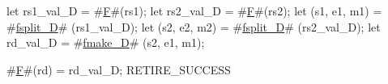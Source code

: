 let rs1_val_D    = #\hyperref[sailRISCVzF]{F}#(rs1);
let rs2_val_D    = #\hyperref[sailRISCVzF]{F}#(rs2);
let (s1, e1, m1) = #\hyperref[sailRISCVzfsplitzyD]{fsplit\_D}# (rs1_val_D);
let (s2, e2, m2) = #\hyperref[sailRISCVzfsplitzyD]{fsplit\_D}# (rs2_val_D);
let rd_val_D     = #\hyperref[sailRISCVzfmakezyD]{fmake\_D}# (s2, e1, m1);

#\hyperref[sailRISCVzF]{F}#(rd) = rd_val_D;
RETIRE_SUCCESS

